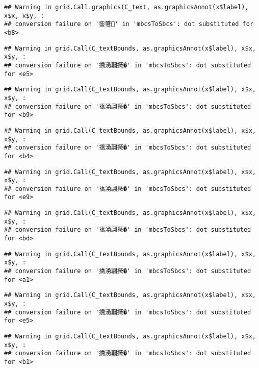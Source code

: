 \documentclass[
]{article}
\begin{document}
\begin{verbatim}
## Warning in grid.Call.graphics(C_text, as.graphicsAnnot(x$label), x$x, x$y, :
## conversion failure on '鈭箸' in 'mbcsToSbcs': dot substituted for <b8>
\end{verbatim}

\begin{verbatim}
## Warning in grid.Call(C_textBounds, as.graphicsAnnot(x$label), x$x, x$y, :
## conversion failure on '撟湧翩撅�' in 'mbcsToSbcs': dot substituted for <e5>
\end{verbatim}

\begin{verbatim}
## Warning in grid.Call(C_textBounds, as.graphicsAnnot(x$label), x$x, x$y, :
## conversion failure on '撟湧翩撅�' in 'mbcsToSbcs': dot substituted for <b9>
\end{verbatim}

\begin{verbatim}
## Warning in grid.Call(C_textBounds, as.graphicsAnnot(x$label), x$x, x$y, :
## conversion failure on '撟湧翩撅�' in 'mbcsToSbcs': dot substituted for <b4>
\end{verbatim}

\begin{verbatim}
## Warning in grid.Call(C_textBounds, as.graphicsAnnot(x$label), x$x, x$y, :
## conversion failure on '撟湧翩撅�' in 'mbcsToSbcs': dot substituted for <e9>
\end{verbatim}

\begin{verbatim}
## Warning in grid.Call(C_textBounds, as.graphicsAnnot(x$label), x$x, x$y, :
## conversion failure on '撟湧翩撅�' in 'mbcsToSbcs': dot substituted for <bd>
\end{verbatim}

\begin{verbatim}
## Warning in grid.Call(C_textBounds, as.graphicsAnnot(x$label), x$x, x$y, :
## conversion failure on '撟湧翩撅�' in 'mbcsToSbcs': dot substituted for <a1>
\end{verbatim}

\begin{verbatim}
## Warning in grid.Call(C_textBounds, as.graphicsAnnot(x$label), x$x, x$y, :
## conversion failure on '撟湧翩撅�' in 'mbcsToSbcs': dot substituted for <e5>
\end{verbatim}

\begin{verbatim}
## Warning in grid.Call(C_textBounds, as.graphicsAnnot(x$label), x$x, x$y, :
## conversion failure on '撟湧翩撅�' in 'mbcsToSbcs': dot substituted for <b1>
\end{verbatim}
\end{document}
